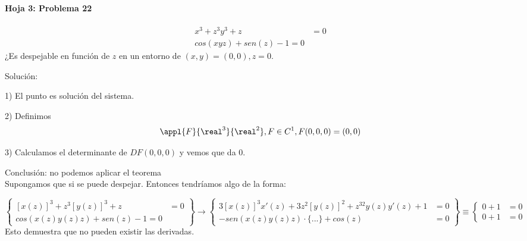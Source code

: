 \paragraph{Hoja 3: Problema 22}

\[\begin{array}{cc}
   x^3+z^3y^3+z &= 0\\
   cos(xyz)+sen(z)-1 = 0
  \end{array}\]
 ¿Es despejable en función de $z$ en un entorno de $(x,y) = (0,0), z=0$.
 
 Solución:
 
 1) El punto es solución del sistema.
 
 2) Definimos \[\appl{F}{\real^3}{\real^2}, F\in C^1, F(0,0,0)=(0,0)\]
 
 3) Calculamos el determinante de $DF(0,0,0)$ y vemos que da $0$.
 
 Conclusión: no podemos aplicar el teorema\\
 Supongamos que si se puede despejar. Entonces tendríamos algo de la forma:

 \[\left\{\begin{array}{cc}
   [x(z)]^3+z^3[y(z)]^3+z &= 0\\
   cos(x(z)y(z)z)+sen(z)-1 = 0
  \end{array}\right\}\rightarrow \left\{ \begin{array}{cc}
               3[x(z)]^3x'(z) + 3z^2[y(z)]^2 + z^32y(z)y'(z) + 1 &=0\\
               -sen(x(z)y(z)z) \cdot\{...\} + cos(z) &= 0
              \end{array}\right\}
              \equiv\left\{
              \begin{array}{cc}
               0+1&=0\\
               0+1&=0
              \end{array}\right.\]
  Esto demuestra que no pueden existir las derivadas.